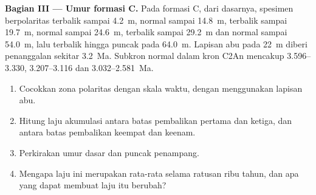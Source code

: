 \begin{problem}
\medskip\noindent\textbf{Bagian III --- Umur formasi C.} Pada formasi C,
dari dasarnya, spesimen berpolaritas terbalik sampai \qty{4.2}{m}, normal sampai
\qty{14.8}{m}, terbalik sampai \qty{19.7}{m}, normal sampai \qty{24.6}{m}, terbalik sampai
\qty{29.2}{m} dan normal sampai \qty{54.0}{m}, lalu terbalik hingga puncak pada
\qty{64.0}{m}. Lapisan abu pada \qty{22}{m} diberi penanggalan sekitar \qty{3.2}{Ma}. Subkron
normal dalam kron C2An mencakup 3.596--3.330, 3.207--3.116 dan
3.032--\qty{2.581}{Ma}.
\begin{enumerate}[resume]
  \item Cocokkan zona polaritas dengan skala waktu, dengan menggunakan lapisan abu.
  \item Hitung laju akumulasi antara batas pembalikan pertama dan ketiga,
        dan antara batas pembalikan keempat dan keenam.
  \item Perkirakan umur dasar dan puncak penampang.
  \item Mengapa laju ini merupakan rata-rata selama ratusan ribu tahun, dan apa
        yang dapat membuat laju itu berubah?
\end{enumerate}


\end{problem}
